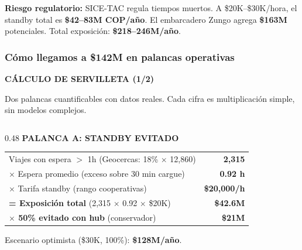 \documentclass[aspectratio=169, 10pt]{beamer}
\newcommand{\tagline}[2]{{\scriptsize\color{#1}\textbf{\MakeUppercase{#2}}}}
\begin{document}
\begin{frame}
\vspace{4pt}
\colorbox{rojoclaro}{\parbox{\dimexpr\textwidth-12pt}{\scriptsize\strut
\textcolor{rojo}{\textbf{Riesgo regulatorio:}} SICE-TAC regula tiempos muertos.
A \$20K--\$30K/hora, el standby total es \textbf{\$42--83M COP/a\~no}.
El embarcadero Zungo agrega \textbf{\$163M} potenciales.
Total exposici\'on: \textcolor{rojo}{\textbf{\$218--246M/a\~no}}.\strut}}
\end{frame}

\begin{frame}
\frametitle{C\'omo llegamos a \$142M en palancas operativas}
\tagline{cian}{C\'alculo de Servilleta (1/2)}
\vspace{-2pt}

{\tiny Dos palancas cuantificables con datos reales. Cada cifra es multiplicaci\'on simple, sin modelos complejos.}

\vspace{4pt}
\begin{columns}[T]
\begin{column}{0.48\textwidth}
{\tiny\color{cian}\textbf{PALANCA A: STANDBY EVITADO}}
\vspace{2pt}

\tiny
\renewcommand{\arraystretch}{1.05}
\begin{tabular}{l r}
    \toprule
    Viajes con espera $>$ 1h (Geocercas: 18\% $\times$ 12,860) & \textcolor{cian}{\textbf{2,315}} \\
    $\times$ Espera promedio (exceso sobre 30 min cargue) & \textcolor{cian}{\textbf{0.92 h}} \\
    $\times$ Tarifa standby (rango cooperativas) & \textcolor{cian}{\textbf{\$20,000/h}} \\
    \midrule
    \textbf{= Exposici\'on total} (2,315 $\times$ 0.92 $\times$ \$20K) & \textcolor{cian}{\textbf{\$42.6M}} \\
    \rowcolor{verdeclaro}
    \textbf{$\times$ 50\% evitado con hub} (conservador) & \textcolor{cian}{\textbf{\$21M}} \\
    \bottomrule
\end{tabular}

\vspace{3pt}
{\tiny\color{gris} Escenario optimista (\$30K, 100\%): \textcolor{cian}{\textbf{\$128M/a\~no}}.}
\end{column}


\end{columns}
\end{frame}
\end{document}
